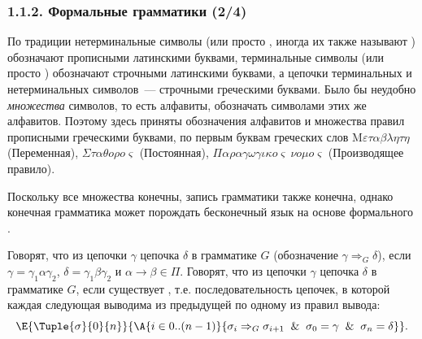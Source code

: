 \begin{frame}
\frametitle{1.1.2. Формальные грамматики (2/4)}

\begin{remark}
По традиции нетерминальные символы (или просто
, 
иногда их также называют ) обозначают прописными латинскими
буквами, терминальные символы (или просто
) обозначают строчными латинскими
буквами, а цепочки терминальных и нетерминальных символов~---
строчными греческими буквами.
Было бы неудобно {\em множества} символов, то есть алфавиты, 
обозначать символами этих же алфавитов.
Поэтому здесь приняты обозначения алфавитов и множества правил прописными
греческими буквами, по первым буквам греческих слов
$\mathrm{M}\varepsilon\tau\alpha\beta\lambda\eta\tau\eta$ (Переменная),
$\Sigma\tau\alpha\theta o\rho o\varsigma$ (Постоянная),
$\Pi\alpha\rho\alpha\gamma\omega\gamma\iota\kappa o\varsigma
\ \nu o\mu o\varsigma$ (Производящее правило).
\end{remark}

\medskip
Поскольку все множества конечны, 
запись грамматики также конечна,
однако конечная грамматика может порождать
бесконечный язык на основе 
формального .

\medskip   
Говорят, что из цепочки $\gamma$  цепочка $\delta$ в
грамматике $G$ (обозначение $\gamma\Rightarrow_G \delta$), если
$\gamma=\gamma_1\alpha\gamma_2$, $\delta=\gamma_1\beta\gamma_2$ и
$\alpha\rightarrow\beta\in \Pi$. Говорят, что из цепочки $\gamma$
 цепочка $\delta$ в грамматике $G$,
если существует , т.е. последовательность цепочек, в которой каждая следующая выводима из предыдущей по одному из правил вывода: 
$$\E{\Tuple{\sigma}{0}{n}}
{\A{i\in 0..(n-1)}{\sigma_{i}\Rightarrow_G\sigma_{i+1} \And \sigma_0 = \gamma
\And \sigma_n = \delta}}.$$ 
\end{frame}

